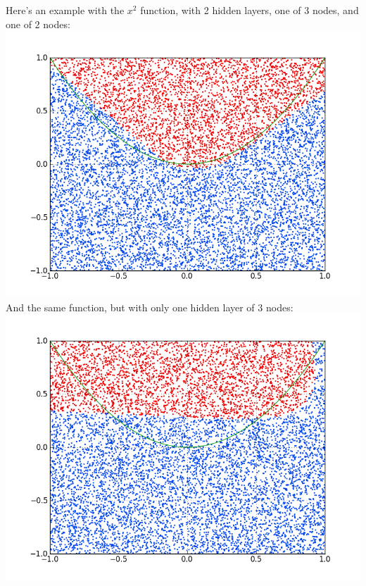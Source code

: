 \documentclass[12pt]{article}
\begin{document}
\begin{enumerate}
Here's an example with the $x^2$ function, with 2 hidden layers, one of 3 nodes, and one of 2 nodes: \\ 
\includegraphics[scale=0.5]{test3.png}\\

And the same function, but with only one hidden layer of 3 nodes: \\ 
\includegraphics[scale=0.5]{test4.png}\\


\end{enumerate}
\end{document}
